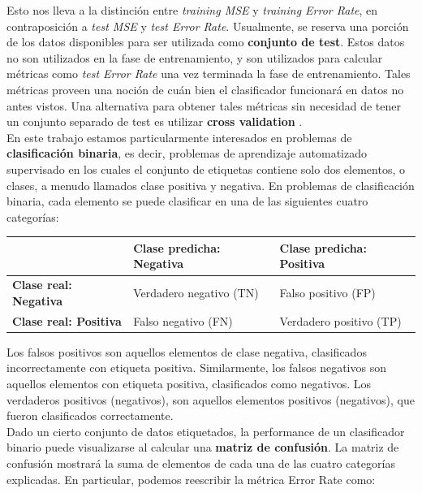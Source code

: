 Esto nos lleva a la distinción entre \textit{training MSE} y \textit{training Error Rate}, en contraposición a \textit{test MSE} y \textit{test Error Rate}. Usualmente, se reserva una porción de los datos disponibles para ser utilizada como \textbf{conjunto de test}. Estos datos no son utilizados en la fase de entrenamiento, y son utilizados para calcular métricas como \textit{test Error Rate} una vez terminada la fase de entrenamiento. Tales métricas proveen una noción de cuán bien el clasificador funcionará en datos no antes vistos. Una alternativa para obtener tales métricas sin necesidad de tener un conjunto separado de test es utilizar \textbf{cross validation} \cite{cross_validation}. \\

En este trabajo estamos particularmente interesados en problemas de \textbf{clasificación binaria}, es decir, problemas de aprendizaje automatizado supervisado en los cuales el conjunto de etiquetas contiene solo dos elementos, o clases, a menudo llamados clase positiva y negativa. En problemas de clasificación binaria, cada elemento se puede clasificar en una de las siguientes cuatro categorías: \\

\begin{table}[h!]
\begin{tabular}{l|l|l|}
\cline{2-3}
                                                    & \textbf{Clase predicha: Negativa} & \textbf{Clase predicha: Positiva} \\ \hline
\multicolumn{1}{|l|}{\textbf{Clase real: Negativa}} & Verdadero negativo (TN)           & Falso positivo (FP)               \\ \hline
\multicolumn{1}{|l|}{\textbf{Clase real: Positiva}} & Falso negativo (FN)               & Verdadero positivo (TP)           \\ \hline
\end{tabular}
\end{table}

Los falsos positivos son aquellos elementos de clase negativa, clasificados incorrectamente con etiqueta positiva. Similarmente, los falsos negativos son aquellos elementos con etiqueta positiva, clasificados como negativos. Los verdaderos positivos (negativos), son aquellos elementos positivos (negativos), que fueron clasificados correctamente. \\

Dado un cierto conjunto de datos etiquetados, la performance de un clasificador binario puede visualizarse al calcular una \textbf{matriz de confusión}. La matriz de confusión mostrará la suma de elementos de cada una de las cuatro categorías explicadas. En particular, podemos reescribir la métrica Error Rate como: \\

